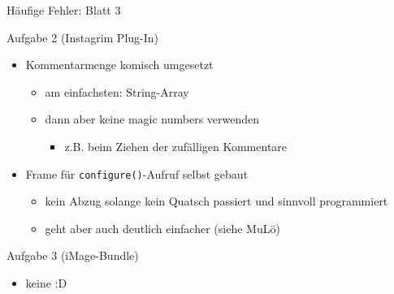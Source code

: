 \documentclass[18pt]{beamer}
\begin{document}
\begin{frame}{Häufige Fehler: Blatt 3}
	\begin{block}{Aufgabe 2 (Instagrim Plug-In)}
	\begin{itemize}
		\pause
		\item Kommentarmenge komisch umgesetzt
		\begin{itemize}
			\item am einfachsten: String-Array
			\item dann aber keine magic numbers verwenden
			\begin{itemize}
				\item z.B. beim Ziehen der zufälligen Kommentare
			\end{itemize}
		\end{itemize}
		\pause
		\item Frame für \texttt{configure()}-Aufruf selbst gebaut
		\begin{itemize}
			\item kein Abzug solange kein Quatsch passiert und sinnvoll programmiert
			\item geht aber auch deutlich einfacher (siehe MuLö)
		\end{itemize}
	\end{itemize}
	\end{block}\pause

	\begin{block}{Aufgabe 3 (iMage-Bundle)}
	\begin{itemize}
	\item keine :D
	\end{itemize}
	\end{block}
\end{frame}
\end{document}
